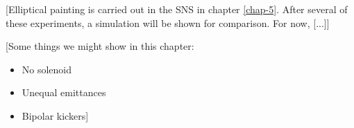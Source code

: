 [Elliptical painting is carried out in the SNS in chapter \ref{chap-5}. After several of these experiments, a simulation will be shown for comparison. For now, [...]]

[Some things we might show in this chapter:
\begin{itemize}
    \item No solenoid
    \item Unequal emittances
    \item Bipolar kickers]
\end{itemize}


